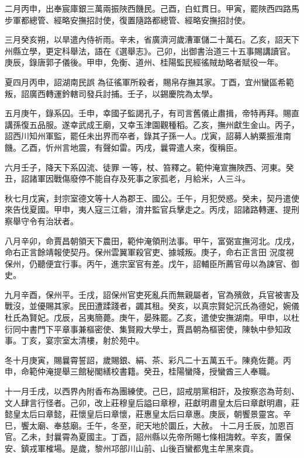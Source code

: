 \begin{pinyinscope}
 二月丙申，出奉宸庫銀三萬兩振陜西饑民。己酉，白虹貫日。甲寅，罷陜西四路馬步軍都總管、經略安撫招討使，復置隨路都總管、經略安撫招討使。



 三月癸亥朔，以旱遣內侍祈雨。辛未，省廣濟河歲漕軍儲二十萬石。乙亥，詔天下州縣立學，更定科舉法，語在《選舉志》。己卯，出御書治道三十五事賜講讀官。庚辰，錄唐郭子儀後。甲申，免衡、道州、桂陽監民經徭賊劫略者賦役一年。



 夏四月丙申，詔湖南民誤
 為征徭軍所殺者，賜帛存撫其家。丁酉，宜州蠻區希範叛，詔廣西轉運鈐轄司發兵討捕。壬子，以錫慶院為太學。



 五月庚午，錄系囚。壬申，幸國子監謁孔子，有司言舊儀止肅揖，帝特再拜。賜直講孫復五品服。遂幸武成王廟，又幸玉津園觀種稻。乙亥，撫州獻生金山。丙子，詔西川知州軍監，罷任未出界而卒者，錄其子孫一人。戊寅，詔募人納粟振淮南饑。乙酉，忻州言地震，有聲如雷。丙戌，曩霄遣人來，復稱臣。



 六月壬子，降天下系囚流、徒罪
 一等，杖、笞釋之。範仲淹宣撫陜西、河東。癸丑，詔諸軍因戰傷廢停不能自存及死事之家孤老，月給米，人三斗。



 秋七月戊寅，封宗室德文等十人為郡王、國公。壬午，月犯熒惑。癸未，契丹遣使來告伐夏國。甲申，夷人寇三江砦，淯井監官兵擊走之。丙戌，詔諸路轉運、提刑察舉守令有治狀者。



 八月辛卯，命賈昌朝領天下農田，範仲淹領刑法事。甲午，富弼宣撫河北。戊戌，命右正言餘靖報使契丹。保州雲翼軍殺官吏、據城叛。庚子，命右正言田
 況度視保州，仍聽便宜行事。丙午，進宗室官有差。戊午，詔輔臣所薦官毋以為諫官、御史。



 九月辛酉，保州平。壬戌，詔保州官吏死亂兵而無親屬者，官為殯斂，兵官被害及戰沒，並優賜其家。民田遭蹂踐者，蠲其租。癸亥，以真宗賢妃沉氏為德妃，婉儀杜氏為賢妃。戊辰，呂夷簡薨。庚午，晏殊罷。乙亥，遣使安撫湖南。甲申，以杜衍同中書門下平章事兼樞密使、集賢殿大學士，賈昌朝為樞密使，陳執中參知政事。丁亥，宴宗室太清樓，射於苑中。



 冬十月庚寅，賜曩霄誓詔，歲賜銀、絹、茶、彩凡二十五萬五千。陳堯佐薨。丙申，命範仲淹提舉三館秘閣繕校書籍。癸丑，桂陽蠻降，授蠻酋三人奉職。



 十一月壬戌，以西界內附香布為團練使。己巳，詔戒朋黨相訐，及按察恣為苛刻、文人肆言行怪者。己卯，改上莊穆皇后謚曰章穆，莊獻明肅皇太后曰章獻明肅，莊懿皇太后曰章懿，莊懷皇后曰章懷，莊惠皇太后曰章惠。庚辰，朝饗景靈宮。辛巳，饗太廟、奉慈廟。壬午，冬至，祀天地於圜丘，大赦。
 十二月壬辰，加恩百官。乙未，封曩霄為夏國主。丁酉，詔州縣以先帝所賜七條相誨敕。辛亥，置保安、鎮戎軍榷場。是歲，黎州邛部川山前、山後百蠻都鬼主牟黑來貢。




\end{pinyinscope}
